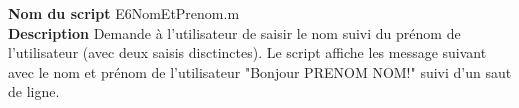 \textbf{Nom du script}
E6NomEtPrenom.m\\
\textbf{Description}
Demande à l’utilisateur de saisir le nom suivi du prénom de l'utilisateur (avec deux saisis disctinctes). Le script affiche les message suivant avec le nom et prénom de l'utilisateur "Bonjour PRENOM NOM!" suivi d'un saut de ligne.
